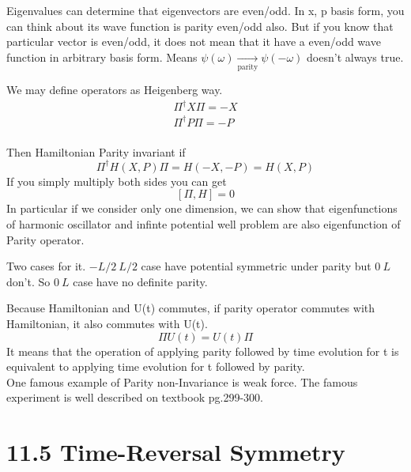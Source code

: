 \documentclass[a4paper,12pt]{article}
\begin{document}
Eigenvalues can determine that eigenvectors are even/odd. In x, p basis form, you can think about its wave function is parity even/odd also.
But if you know that particular vector is even/odd, it does not mean that it have a even/odd wave function in arbitrary basis form.
Means \(\psi(\omega) \underset{\text{parity}}{\longrightarrow} \psi(-\omega)\) doesn't always true.

We may define operators as Heigenberg way.
\begin{align*}
  \Pi^\dagger X \Pi = -X \\
  \Pi^\dagger P \Pi = -P \\
\end{align*}

Then Hamiltonian Parity invariant if
\[
\Pi^\dagger H(X,P) \Pi = H(-X,-P) = H(X,P)
\]
If you simply multiply both sides you can get
\[
[\Pi,H]=0 
\]
In particular if we consider only one dimension, we can show that eigenfunctions of harmonic oscillator and infinte potential well problem are also eigenfunction of
Parity operator.
\begin{remark}
  Two cases for it. \(-L/2 ~ L/2\) case have potential symmetric under parity but \(0~L\) don't. So \(0~L\) case
  have no definite parity.
\end{remark}

Because Hamiltonian and U(t) commutes, if parity operator commutes with Hamiltonian, it also commutes with U(t).
\[
\Pi U(t)=U(t)\Pi
\]
It means that the operation of applying parity followed by time evolution for
t is equivalent to applying time evolution for
t followed by parity. \\
\indent One famous example of Parity non-Invariance is weak force. The famous experiment is well described on textbook pg.299-300.
\newpage

\section*{11.5 Time-Reversal Symmetry}
\end{document}
